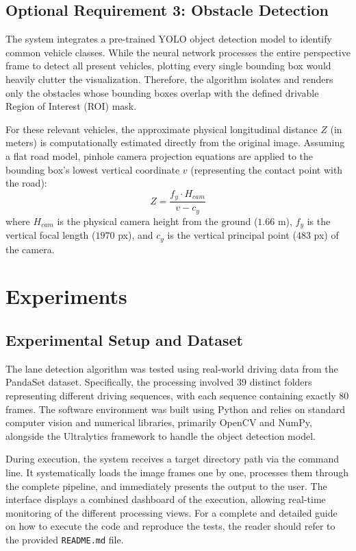 \documentclass[12pt,a4paper]{article}
\begin{document}
\subsection{Optional Requirement 3: Obstacle Detection}
The system integrates a pre-trained YOLO object detection model to identify common vehicle classes. While the neural network processes the entire perspective frame to detect all present vehicles, plotting every single bounding box would heavily clutter the visualization. Therefore, the algorithm isolates and renders only the obstacles whose bounding boxes overlap with the defined drivable Region of Interest (ROI) mask. 

For these relevant vehicles, the approximate physical longitudinal distance $Z$ (in meters) is computationally estimated directly from the original image. Assuming a flat road model, pinhole camera projection equations are applied to the bounding box's lowest vertical coordinate $v$ (representing the contact point with the road):
\begin{equation}
    Z = \frac{f_y \cdot H_{cam}}{v - c_y}
\end{equation}
where $H_{cam}$ is the physical camera height from the ground ($1.66$ m), $f_y$ is the vertical focal length ($1970$ px), and $c_y$ is the vertical principal point ($483$ px) of the camera.

\section{Experiments}

\subsection{Experimental Setup and Dataset}
The lane detection algorithm was tested using real-world driving data from the PandaSet dataset. Specifically, the processing involved 39 distinct folders representing different driving sequences, with each sequence containing exactly 80 frames. The software environment was built using Python and relies on standard computer vision and numerical libraries, primarily OpenCV and NumPy, alongside the Ultralytics framework to handle the object detection model.

During execution, the system receives a target directory path via the command line. It systematically loads the image frames one by one, processes them through the complete pipeline, and immediately presents the output to the user. The interface displays a combined dashboard of the execution, allowing real-time monitoring of the different processing views. For a complete and detailed guide on how to execute the code and reproduce the tests, the reader should refer to the provided \texttt{README.md} file.
\end{document}
